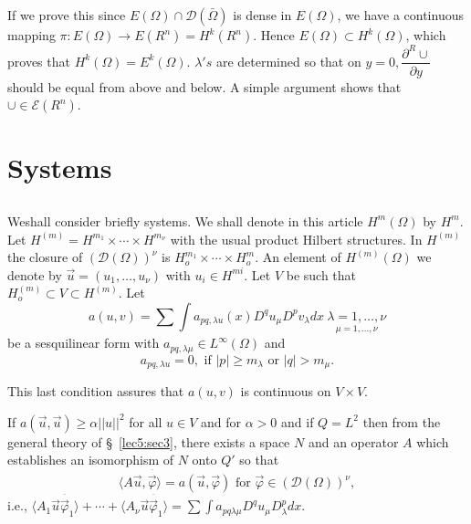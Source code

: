If we prove this since $E(\Omega) \cap \mathscr{D} (\bar{\Omega})$ is
dense in $E(\Omega)$, we have a continuous mapping $\pi : E (\Omega)
\to E (R^n) = H^k (R^n)$. Hence $E(\Omega) \subset H^k (\Omega)$,
which proves that $H^k (\Omega) = E^k (\Omega)$. $\lambda's$ are
determined so that on $y= 0, \dfrac{\partial^R \cup}{\partial y}$
should be equal from above and below. A simple argument shows that
$\cup \in \mathscr{E} (R^n)$. 

\section{Systems}\label{lec25:sec14}%

\subsection{}\label{lec25:sec14:subsec1} %

We\pageoriginale shall consider briefly systems. We shall
denote in this article $H^m (\Omega)$ by $H^m$. Let $H^{(m)} = H^{m_1}
\times \cdots \times  H^{m_\nu}$ with the usual product Hilbert
structures. In $H^{(m)}$ the closure of $(\mathscr{D}(\Omega))^{\nu}$
is $H^{m_1}_o \times \cdots \times H^m_o$. An element of $H^{(m)}(\Omega)$ we denote
by $\overset{\to}u = (u_1, \ldots, u_\nu)$ with $u_i \in
H^{mi}$. Let $V$ be such that $H^{(m)}_o \subset V \subset H^{(m)}$. Let  
$$
a(u, v) = \sum \int a_{pq, \lambda u} (x) D^{q} u_{\mu}  D^p
v_{\lambda} dx ~\underset{\mu = 1, \ldots, \nu}{\lambda = 1, \ldots,
  \nu} 
$$
be a sesquilinear form with $a_{pq, \lambda \mu} \in L^\infty(\Omega)$ and 
$$
a_{pq, \lambda u} = 0, \text { if } |p|\ge m_\lambda \text{ or } |q| > m_\mu.
$$

This last condition assures that $a(u, v)$ is continuous on $V \times V$.

If $a(\overset{\to}u, \overset{\to}u ) \ge \alpha || u||^2$ for all $u
\in V$ and for $\alpha > 0$ and if $Q = L^2$ then from the
general theory of \S\ \ref{lec5:sec3}, there exists a space $N$ and an operator $A$
which establishes an isomorphism of $N$ onto $Q'$ so that  
$$
\langle A \overset{\to}u, \overset{\overline{\to}}\varphi \rangle = a
(\overset{\to}u, \overset{\to}\varphi) \text{ for }
\overset{\to}\varphi \in (\mathscr{D}(\Omega))^\nu,  
$$ 
i.e., \quad $\langle A_1 \overset{\to}u \overset{\overline{\to}}\varphi_1
\rangle + \cdots + \langle A_\nu \overset{\to}u
\overset{\overline{\to}}\varphi_1 \rangle = \sum \int a_{pq \lambda
  \mu} D^q u_\mu D^p_\lambda dx$. 

